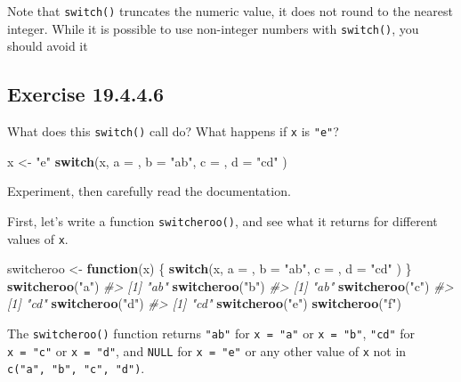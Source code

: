 \documentclass[]{book}
\newenvironment{Shaded}{\begin{snugshade}}{\end{snugshade}}
\newcommand{\CommentTok}[1]{\textcolor[rgb]{0.56,0.35,0.01}{\textit{#1}}}
\newcommand{\ControlFlowTok}[1]{\textcolor[rgb]{0.13,0.29,0.53}{\textbf{#1}}}
\newcommand{\DataTypeTok}[1]{\textcolor[rgb]{0.13,0.29,0.53}{#1}}
\newcommand{\KeywordTok}[1]{\textcolor[rgb]{0.13,0.29,0.53}{\textbf{#1}}}
\newcommand{\NormalTok}[1]{#1}
\newcommand{\StringTok}[1]{\textcolor[rgb]{0.31,0.60,0.02}{#1}}
\theoremstyle{plain}
\theoremstyle{remark}
\begin{document}
Note that \texttt{switch()} truncates the numeric value, it does not
round to the nearest integer. While it is possible to use non-integer
numbers with \texttt{switch()}, you should avoid it

\hypertarget{exercise-19.4.4.6}{%
\subsection*{\texorpdfstring{Exercise
{19.4.4.6}}{Exercise 19.4.4.6}}\label{exercise-19.4.4.6}}

What does this \texttt{switch()} call do? What happens if \texttt{x} is
\texttt{"e"}?

\begin{Shaded}
\begin{Highlighting}[]
\NormalTok{x <-}\StringTok{ "e"}
\ControlFlowTok{switch}\NormalTok{(x,}
  \DataTypeTok{a =}\NormalTok{ ,}
  \DataTypeTok{b =} \StringTok{"ab"}\NormalTok{,}
  \DataTypeTok{c =}\NormalTok{ ,}
  \DataTypeTok{d =} \StringTok{"cd"}
\NormalTok{)}
\end{Highlighting}
\end{Shaded}

Experiment, then carefully read the documentation.

First, let's write a function \texttt{switcheroo()}, and see what it
returns for different values of \texttt{x}.

\begin{Shaded}
\begin{Highlighting}[]
\NormalTok{switcheroo <-}\StringTok{ }\ControlFlowTok{function}\NormalTok{(x) \{}
  \ControlFlowTok{switch}\NormalTok{(x,}
    \DataTypeTok{a =}\NormalTok{ ,}
    \DataTypeTok{b =} \StringTok{"ab"}\NormalTok{,}
    \DataTypeTok{c =}\NormalTok{ ,}
    \DataTypeTok{d =} \StringTok{"cd"}
\NormalTok{  )}
\NormalTok{\}}
\KeywordTok{switcheroo}\NormalTok{(}\StringTok{"a"}\NormalTok{)}
\CommentTok{#> [1] "ab"}
\KeywordTok{switcheroo}\NormalTok{(}\StringTok{"b"}\NormalTok{)}
\CommentTok{#> [1] "ab"}
\KeywordTok{switcheroo}\NormalTok{(}\StringTok{"c"}\NormalTok{)}
\CommentTok{#> [1] "cd"}
\KeywordTok{switcheroo}\NormalTok{(}\StringTok{"d"}\NormalTok{)}
\CommentTok{#> [1] "cd"}
\KeywordTok{switcheroo}\NormalTok{(}\StringTok{"e"}\NormalTok{)}
\KeywordTok{switcheroo}\NormalTok{(}\StringTok{"f"}\NormalTok{)}
\end{Highlighting}
\end{Shaded}

The \texttt{switcheroo()} function returns \texttt{"ab"} for
\texttt{x\ =\ "a"} or \texttt{x\ =\ "b"}, \texttt{"cd"} for
\texttt{x\ =\ "c"} or \texttt{x\ =\ "d"}, and \texttt{NULL} for
\texttt{x\ =\ "e"} or any other value of \texttt{x} not in
\texttt{c("a",\ "b",\ "c",\ "d")}.
\end{document}
